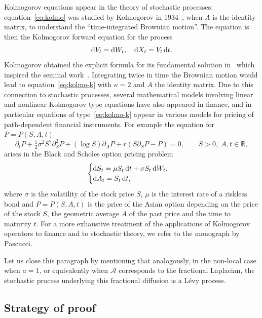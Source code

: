 \documentclass[JEP,XML,SOM,Unicode,NoFloatCountersInSection,published]{cedram}
\theoremstyle{definition}
\newcommand{\dd}{{\, \mathrm d}}
\let\s\sigma
\let\p\partial
\begin{document}
Kolmogorov equations appear in the theory of stochastic
processes: equation~\eqref{eq:kolmo} was studied by
Kolmogorov in 1934~\cite{kolmogorov}, when $A$ is the identity
matrix, to understand the ``time-integrated Brownian motion''. The
equation is then the Kolmogorov forward equation for the
process
\begin{equation*}
{\rm d} V_t = {\rm d} W_{t}, \quad
{\rm d} X_t = V_{t} \dd t.
\end{equation*}
Kolmogorov obtained the explicit formula for its fundamental solution
in~\cite{kolmogorov} which inspired the seminal
work~\cite{MR0222474}. Integrating twice in time the Brownian motion
would lead to equation~\eqref{eq:kolmo-k} with $\kappa=2$ and $A$
the identity matrix. Due to this connection to stochastic
processes, several mathematical models involving linear and nonlinear Kolmogorov type equations have also appeared in finance, and in particular equations of
type~\eqref{eq:kolmo-k} appear in various models for pricing of
path-dependent financial instruments. For
example the equation for $P=P(S,A,t)$
\begin{equation}
\label{bpv}
\p_t P + \tfrac12 \s^{2} S^2 \p^2_S P + (\log S) \p_{A} P + r
(S \p_{S} P - P) = 0, \qquad S > 0,
\; A, t \in \mathbb{R},
\end{equation}
arises in the Black and Scholes option pricing problem
\begin{equation*}
\begin{cases}
{\rm d} S_t = \mu S_{t} \dd t + \s S_{t} \dd W_{t}, \\
{\rm d} A_t = S_{t} \dd t,
\end{cases}
\end{equation*}
where $\s$ is the volatility of the stock price $S$, $\mu$ is the
interest rate of a riskless bond and $P= P(S, A, t)$ is the price
of the Asian option depending on the price of the stock $S$, the
geometric average $A$ of the past price and the time to maturity
$t$. For a more exhaustive treatment of the applications of
Kolmogorov operators to finance and to stochastic theory, we
refer to the monograph \cite{Pascucci} by Pascucci.

Let us close this paragraph by mentioning that analogously,
in the non-local case when $a = 1$,
or equivalently when $\mathcal A$ corresponds to
the fractional Laplacian, the stochastic
process underlying this fractional diffusion is a Lévy process.

\subsection{Strategy of proof}
\end{document}
